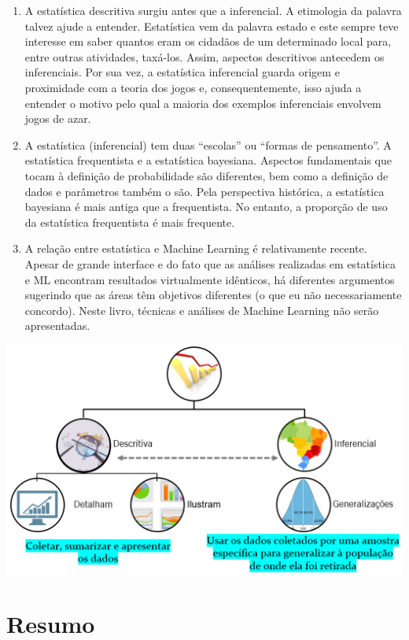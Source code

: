 \documentclass[
]{book}
\begin{document}
\begin{enumerate}
\def\labelenumi{\arabic{enumi}.}
\item
  A estatística descritiva surgiu antes que a inferencial. A etimologia da palavra talvez ajude a entender. Estatística vem da palavra estado e este sempre teve interesse em saber quantos eram os cidadãos de um determinado local para, entre outras atividades, taxá-los. Assim, aspectos descritivos antecedem os inferenciais. Por sua vez, a estatística inferencial guarda origem e proximidade com a teoria dos jogos e, consequentemente, isso ajuda a entender o motivo pelo qual a maioria dos exemplos inferenciais envolvem jogos de azar.
\item
  A estatística (inferencial) tem duas ``escolas'' ou ``formas de pensamento''. A estatística frequentista e a estatística bayesiana. Aspectos fundamentais que tocam à definição de probabilidade são diferentes, bem como a definição de dados e parâmetros também o são. Pela perspectiva histórica, a estatística bayesiana é mais antiga que a frequentista. No entanto, a proporção de uso da estatística frequentista é mais frequente.
\item
  A relação entre estatística e Machine Learning é relativamente recente. Apesar de grande interface e do fato que as análises realizadas em estatística e ML encontram resultados virtualmente idênticos, há diferentes argumentos sugerindo que as áreas têm objetivos diferentes (o que eu não necessariamente concordo). Neste livro, técnicas e análises de Machine Learning não serão apresentadas.
\end{enumerate}

\includegraphics{./img/cap_areas_estatistica.png}

\hypertarget{resumo-1}{%
\section{Resumo}\label{resumo-1}}
\end{document}
